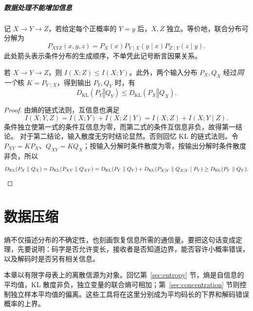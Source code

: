 \documentclass[lang=cn,a4paper,fontset=none,zihao=false,10pt,openany,twoside]{beautybook}
\numberwithin{algorithm}{chapter}
\newcommand{\KLsep}{\mathrel{\Vert}}
\begin{document}
\paragraph{数据处理不能增加信息}
\begin{definition}
记 $X\to Y\to Z$，若给定每个正概率的 $Y=y$ 后，$X,Z$ 独立。等价地，联合分布可分解为
\[
 P_{XYZ}(x,y,z)=P_X(x)P_{Y\mid X}(y\mid x)P_{Z\mid Y}(z\mid y).
\]
此处箭头表示条件分布的生成顺序，不单凭此记号断言因果关系。
\end{definition}
\begin{proposition}[数据处理不等式]\label{prop:data-processing}
若 $X\to Y\to Z$，则 $I(X;Z)\le I(X;Y)$。此外，两个输入分布 $P_X,Q_X$ 经过\emph{同一个}核 $K=P_{Y\mid X}$，得到输出 $P_Y,Q_Y$ 时，有
\[
 D_{\mathrm{KL}}(P_Y\KLsep Q_Y)\le D_{\mathrm{KL}}(P_X\KLsep Q_X).
\]
\end{proposition}
\begin{proof}
由熵的链式法则，互信息也满足
\[
 I(X;Y,Z)=I(X;Y)+I(X;Z\mid Y)
 =I(X;Z)+I(X;Y\mid Z).
\]
条件独立使第一式的条件互信息为零，而第二式的条件互信息非负，故得第一结论。
对于第二结论，输入散度无穷时结论显然。否则回忆 KL 的链式法则。令 $P_{XY}=KP_X$、$Q_{XY}=KQ_X$；按输入分解时条件散度为零，按输出分解时条件散度非负，所以
\[
 D_{\mathrm{KL}}(P_X\KLsep Q_X)=D_{\mathrm{KL}}(P_{XY}\KLsep Q_{XY})
 =D_{\mathrm{KL}}(P_Y\KLsep Q_Y)
 +D_{\mathrm{KL}}(P_{X\mid Y}\KLsep Q_{X\mid Y}\mid P_Y)
 \ge D_{\mathrm{KL}}(P_Y\KLsep Q_Y).\qedhere
\]
\end{proof}

\FloatBarrier
\chapter{数据压缩}\label{chap:compression}
\begin{wenxintishi}
熵不仅描述分布的不确定性，也刻画恢复信息所需的通信量。要把这句话变成定理，先要说明：码字是否允许变长，接收者是否知道边界，能否容许小概率错误，以及解码时是否另有相关信息。
\end{wenxintishi}
本章以有限字母表上的离散信源为对象。回忆第~\ref{sec:entropy} 节，熵是自信息的平均值，KL 散度非负，独立变量的联合熵可相加；第~\ref{sec:concentration} 节则控制独立样本平均值的偏离。这些工具将在这里分别成为平均码长的下界和解码错误概率的上界。
\end{document}
